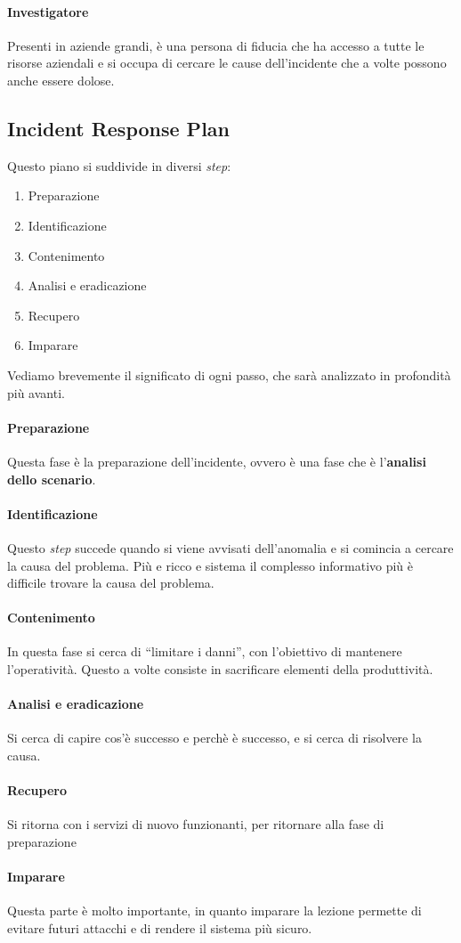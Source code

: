 \paragraph*{Investigatore} Presenti in aziende grandi, è una persona di fiducia
che ha accesso a tutte le risorse aziendali e si occupa di cercare le cause
dell'incidente che a volte possono anche essere dolose.



\subsection{Incident Response Plan}

Questo piano si suddivide in diversi \textit{step}:
\begin{enumerate}
\item Preparazione
\item Identificazione
\item Contenimento
\item Analisi e eradicazione
\item Recupero
\item Imparare
\end{enumerate}

Vediamo brevemente il significato di ogni passo, che sarà analizzato in
profondità più avanti.

\paragraph*{Preparazione} Questa fase è la preparazione dell'incidente, ovvero è
una fase che è l'\textbf{analisi dello scenario}.

\paragraph*{Identificazione} Questo \textit{step} succede quando si viene
avvisati dell'anomalia e si comincia a cercare la causa del problema. Più e
ricco e sistema il complesso informativo più è difficile trovare la causa del
problema.

\paragraph*{Contenimento} In questa fase si cerca di ``limitare i danni'', con
l'obiettivo di mantenere l'operatività. Questo a volte consiste in sacrificare
elementi della produttività.

\paragraph*{Analisi e eradicazione} Si cerca di capire cos'è successo e perchè è
successo, e si cerca di risolvere la causa.

\paragraph*{Recupero} Si ritorna con i servizi di nuovo funzionanti, per
ritornare alla fase di preparazione

\paragraph*{Imparare} Questa parte è molto importante, in quanto imparare la
lezione permette di evitare futuri attacchi e di rendere il sistema più sicuro.
